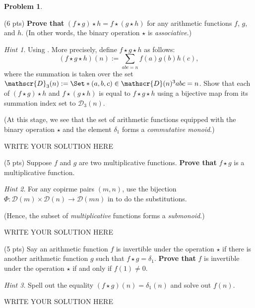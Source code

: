 \documentclass[11pt]{article}
\theoremstyle{plain}
\theoremstyle{definition}
\newtheorem{problem}{Problem}
\theoremstyle{remark}
\newtheorem*{hint}{Hint}
\numberwithin{equation}{problem}
\providecommand\given{}
\begin{document}
\begin{problem}
\begin{listinprob}
		\item (6 pts) \textbf{Prove that} $(f\star g)\star h = f\star (g\star h)$ for any arithmetic functions $f$, $g$, and $h$. (In other words, the binary operation $\star$ is \emph{associative}.)
		\begin{hint}
			Using \cite[Exercise 7.2]{LecNote}.
			More precisely, 
			define $f\star g\star h$ as follows:
			\[
				(f\star g\star h)(n):=\sum_{abc=n}f(a)g(b)h(c),
			\]
			where the summation is taken over the set $\mathscr{D}_{3}(n):=\Set*{ (a,b,c)\in\mathscr{D}(n)^3 \given abc=n }$. 
			Show that each of $(f\star g)\star h$ and $f\star (g\star h)$ is equal to $f\star g\star h$ using a bijective map from its summation index set to $\mathscr{D}_{3}(n)$. 
		\end{hint}
		(At this stage, we see that the set of arithmetic functions equipped with the binary operation $\star$ and the element $\delta_{1}$ forms a \emph{commutative monoid}.)
\begin{solution} %
WRITE YOUR SOLUTION HERE
\end{solution}\clearpage %

		\item (5 pts) Suppose $f$ and $g$ are two multiplicative functions. \textbf{Prove that} $f \star g$ is a multiplicative function.
		\begin{hint}
			For any copirme pairs $(m,n)$, use the bijection 
			$\Phi\colon \mathscr{D}(m)\times\mathscr{D}(n) \rightarrow \mathscr{D}(mn)$ in \cite[Theorem 7.1]{LecNote} to do the substitutions.
		\end{hint}
		(Hence, the subset of \emph{multiplicative} functions forms a \emph{submonoid}.)
\begin{solution} %
WRITE YOUR SOLUTION HERE
\end{solution}\clearpage %

		\item (5 pts) Say an arithmetic function $f$ is invertible under the operation $\star$ if there is another arithmetic function $g$ such that $f\star g=\delta_{1}$. \textbf{Prove that} $f$ is invertible under the operation $\star$ if and only if $f(1)\neq 0$. 
		\begin{hint}
			Spell out the equality $(f\star g)(n) = \delta_{1}(n)$ and solve out $f(n)$.
		\end{hint}
	\end{listinprob}
\end{problem}
\begin{solution} %
WRITE YOUR SOLUTION HERE
\end{solution}\clearpage %
\end{document}
